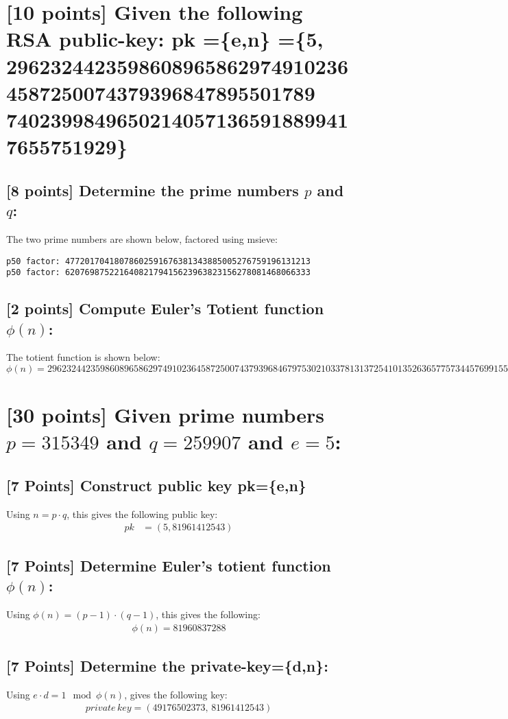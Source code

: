 \documentclass{article}
\begin{document}
\section{[10 points] Given the following RSA public-key: pk =\{e,n\} =\{5, 29623244235986089658629749102364587250074379396847895501789\\
74023998496502140571365918899417655751929\}}
\subsection{[8 points] Determine the prime numbers $p$ and $q$:}
The two prime numbers are shown below, factored using msieve:
\begin{verbatim}
p50 factor: 47720170418078602591676381343885005276759196131213
p50 factor: 62076987522164082179415623963823156278081468066333
\end{verbatim}

\subsection{[2 points] Compute Euler's Totient function $\phi(n)$:}
The totient function is shown below:
$$ \phi(n) = 2962324423598608965862974910236458725007437939684679753021033781313725410135263657757344576991554384 $$

\section{[30 points] Given prime numbers $p=315349$ and $q=259907$ and $e=5$:}
\subsection{[7 Points] Construct public key pk=\{e,n\}}
Using $n = p \cdot q$, this gives the following public key:
\begin{align*}
pk &= (5, 81961412543)
\end{align*}

\subsection{[7 Points] Determine Euler's totient function $\phi(n)$:}
Using $\phi(n) = (p-1) \cdot (q-1)$, this gives the following:
\begin{align*}
\phi(n) = 81960837288
\end{align*}

\subsection{[7 Points] Determine the private-key=\{d,n\}:}
Using $e \cdot d = 1 \mod \phi(n)$, gives the following key:
\begin{align*}
private \, key = (49176502373, \, 81961412543)
\end{align*}
\end{document}
